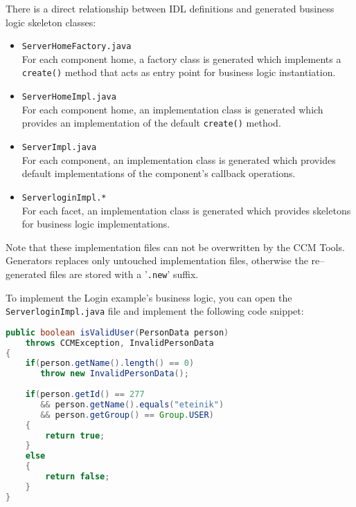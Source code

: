 \vspace{3mm}
There is a direct relationship between IDL definitions and generated business
logic skeleton classes:
\begin{itemize}
	\item {\tt ServerHomeFactory.java} \\
	For each component home, a factory class is generated which implements a {\tt create()}
	method that acts as entry point for business logic instantiation.
		  
	\item {\tt ServerHomeImpl.java}\\
	For each component home, an implementation class is generated which provides an
	implementation of the default {\tt create()} method.

\item {\tt ServerImpl.java}\\
	For each component, an implementation class is generated which provides 
	default implementations of the component's callback operations.
	
\item {\tt ServerloginImpl.*}\\
	For each facet, an implementation class is generated which provides
	skeletons for business logic implementations.
\end{itemize}

\vspace{3mm}
Note that these implementation files can not be overwritten by the CCM Tools.
Generators replaces only untouched implementation files, otherwise the 
re--generated files are stored with a '{\tt .new}' suffix.

 \vspace{3mm}
To implement the Login example's business logic, you can open the 
{\tt ServerloginImpl.java} file and implement the following code snippet:
\begin{footnotesize}
\begin{lstlisting}[language=Java]
public boolean isValidUser(PersonData person)
    throws CCMException, InvalidPersonData
{
    if(person.getName().length() == 0)
       throw new InvalidPersonData();
        
    if(person.getId() == 277
       && person.getName().equals("eteinik")
       && person.getGroup() == Group.USER)
    {
        return true;
    }
    else
    {
        return false;
    }
}    
\end{lstlisting}
\end{footnotesize}

